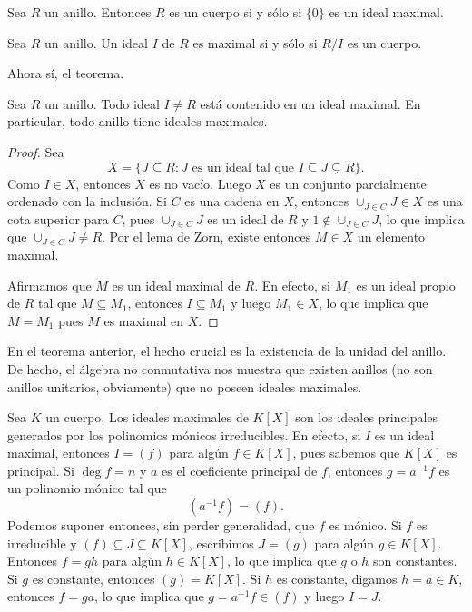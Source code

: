 \begin{exercise}
Sea $R$ un anillo. Entonces $R$ es un cuerpo si y sólo si $\{0\}$ es un ideal maximal. 	
\end{exercise}

\begin{exercise}
Sea $R$ un anillo. Un ideal $I$ de $R$ es maximal si y sólo si $R/I$ es un cuerpo.
\end{exercise}

Ahora sí, el teorema.

\begin{theorem}
Sea $R$ un anillo. Todo ideal $I\ne R$ está contenido en un ideal maximal. En particular, todo anillo tiene ideales maximales. 
\end{theorem}

\begin{proof}
Sea 
\[
X=\{J\subseteq R:J\text{ es un ideal tal que }I\subseteq J\subsetneq R\}.
\]
Como $I\in X$, entonces $X$ es no vacío. Luego 
$X$ es un conjunto parcialmente ordenado con la inclusión. Si $C$ es una cadena en $X$, entonces $\cup_{J\in C}J\in X$
es una cota superior para $C$, pues $\cup_{J\in C}J$ es un ideal de $R$ y $1\not\in \cup_{J\in C}J$, lo que
implica que $\cup_{J\in C}J\ne R$. Por el lema de Zorn, existe entonces $M\in X$ un elemento maximal. 

Afirmamos que $M$ es un ideal maximal de $R$. En efecto, si $M_1$ es un ideal propio de $R$ tal que $M\subseteq M_1$, entonces
$I\subseteq M_1$ y luego $M_1\in X$, lo que implica que $M=M_1$ pues $M$ es maximal en $X$.   
\end{proof}

En el teorema anterior, el hecho crucial es la existencia de la unidad del anillo. 
De hecho, el álgebra no conmutativa nos muestra que existen anillos (no son anillos unitarios, obviamente) 
que no poseen ideales maximales.

\begin{example}
Sea $K$ un cuerpo. 
Los ideales maximales de $K[X]$ son los ideales principales generados por los polinomios mónicos irreducibles. En efecto,
si $I$ es un ideal maximal, entonces $I=(f)$ para algún $f\in K[X]$, pues sabemos que $K[X]$ es principal. Si $\deg f=n$ y 
$a$ es el coeficiente principal de $f$, entonces $g=a^{-1}f$ es un polinomio mónico tal que
\[
(a^{-1}f)=(f).
\] 
Podemos suponer entonces, sin perder generalidad, que $f$ es mónico. Si $f$ es irreducible y $(f)\subseteq J\subseteq K[X]$, escribimos
$J=(g)$ para algún $g\in K[X]$. Entonces $f=gh$ para algún $h\in K[X]$, lo que implica que $g$ o $h$ son constantes. Si $g$ es constante, 
entonces $(g)=K[X]$. Si $h$ es constante, digamos $h=a\in K$, entonces $f=ga$, lo que implica que $g=a^{-1}f\in (f)$ y luego $I=J$.   
\end{example}

